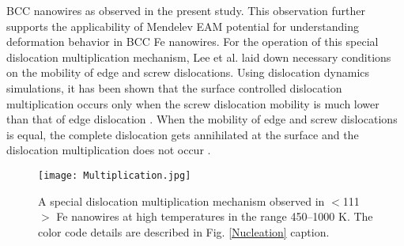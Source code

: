\documentclass[%
reprint,%
 amssymb, amsmath,%
 aip,apl,%
]{revtex4-1}
\begin{document}
BCC nanowires \cite{Cai-Review} as observed in the present study. This observation further supports the applicability of Mendelev 
EAM potential for understanding deformation behavior in BCC Fe nanowires. For the operation of this special dislocation multiplication 
mechanism, Lee et al. \cite{Lee-Woo} laid down necessary conditions on the mobility of edge and screw dislocations. Using dislocation 
dynamics simulations, it has been shown that the surface controlled dislocation multiplication occurs only when the screw dislocation
mobility is much lower than that of edge dislocation \cite{Lee-Woo}. When the mobility of edge and screw dislocations is equal, the 
complete dislocation gets annihilated at the surface and the dislocation multiplication does not occur \cite{Lee-Woo}.

\begin{figure}
\centering
\texttt{[image: Multiplication.jpg]}
\caption {A special dislocation multiplication mechanism observed in $<$111$>$ Fe nanowires at high temperatures in the range 450–1000 K. 
The color code details are described in Fig. \ref{Nucleation} caption.}
\label{Multiplication}
\end{figure}
\end{document}
